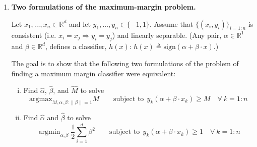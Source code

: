 \documentclass[11pt]{report}
\newcommand{\be}{\begin{enumerate}}
\newcommand{\ee}{\end{enumerate}}
\DeclareMathOperator*{\argmin}{\arg\min}
\renewcommand{\hat}[1]{\widehat{#1}}
\begin{document}
\begin{enumerate}[1.]







	\item {\bf Two formulations of the maximum-margin problem.}

	      Let $x_1,\ldots,x_n\in \mathds{R}^d$  and let $y_1,\ldots,y_n \in \{-1,1\}$.
	      Assume that $\{(x_i,y_i)\}_{i=1:n}$ is consistent (i.e. $x_i=x_j \Rightarrow y_i=y_j$) and linearly separable.
	      (Any pair, $\alpha\in\mathds{R}^1$ and $\beta\in\mathds{R}^d$, defines a classifier, $h(x)$: $h(x)\triangleq \text{sign}\left(\alpha + \beta\cdot x \right)$.)


	      The goal is to show that the following two formulations of the problem of finding a maximum margin classifier were equivalent:

	      \begin{enumerate}[(i)]
		      \item
		            Find $\hat{\alpha}$, $\hat{\beta}$, and $\hat{M}$ to solve
		            \[
			            \text{argmax}_{M,\alpha,\beta:\|\beta\| = 1} M \qquad
			            \text{subject to}\ \ y_k\left(\alpha + \beta\cdot x_k\right) \geq M\quad \forall\ k=1:n
		            \]
		      \item
		            Find $\hat{\alpha}$ and $\hat{\beta}$ to solve
		            \[
			            \argmin_{\alpha,\beta} \frac{1}{2}\sum_{i=1}^d \beta^2 \qquad
			            \text{subject to}\ \ y_k\left(\alpha + \beta\cdot x_k\right) \geq 1\quad \forall\ k=1:n
		            \]



\end{enumerate}
\end{enumerate}
\end{document}

